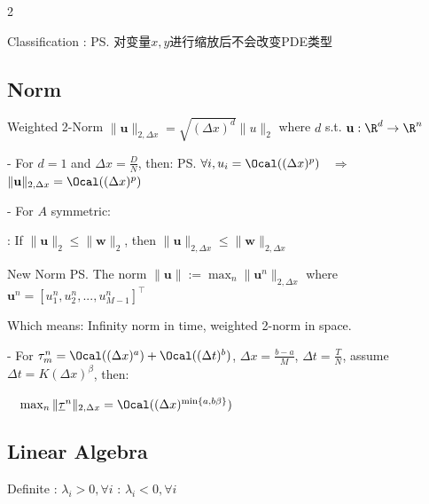 \documentclass{note}
\begin{document}
\begin{multicols}{2}
{{\begin{MyTh}{Classification}
        \quad {}: \ps{\tiny 对变量$x,y$进行缩放后不会改变PDE类型}
    \end{MyTh}

    \subsection{Norm}

    \begin{MyTh}{Weighted 2-Norm}
        $\|\mathbf{u}\|_{2,\Delta x}=\sqrt{(\Delta x)^d}\|u\|_2$ \quad where $d$ s.t. $\mathbf{u}:\R^d\to\R^n$

        \quad - For $d=1$ and $\Delta x=\frac{D}{N}$, then: \ps{$\forall i,u_i=\Ocal((\Delta x)^p)$ \ $\Rightarrow$ \ $\|\mathbf{u}\|_{2,\Delta x}=\Ocal((\Delta x)^p)$}

        \quad - For $A$ symmetric:  \quad {}

        \quad {}: \tiny If $\|\mathbf{u}\|_{2}\leq \|\mathbf{w}\|_{2}$, then $\|\mathbf{u}\|_{2,\Delta x}\leq \|\mathbf{w}\|_{2,\Delta x}$
    \end{MyTh}

    \begin{MyTh}{New Norm}\tiny 
        \ps{The norm $\|\mathbf{u}\|:=\max_{n}\|\mathbf{u}^n\|_{2,\Delta x}$ \quad where $\mathbf{u}^n=[u_1^n,u_2^n,...,u_{M-1}^n]^\top$}

        \qquad\qquad\qquad\quad Which means: Infinity norm in time, weighted 2-norm in space. \quad {}

        \quad - For $\tau^n_m=\Ocal((\Delta x)^a) + \Ocal((\Delta t)^b)$, $\Delta x=\frac{b-a}{M}$, $\Delta t=\frac{T}{N}$, assume $\Delta t=K(\Delta x)^\beta$, then:
        
        \quad \ \ $\max_{n}\|\underline{\tau}^n\|_{2,\Delta x}=\Ocal((\Delta x)^{\min\{a,b\beta\}})$
    \end{MyTh}

    \subsection{Linear Algebra}

    \begin{MyTh}{Definite}\tiny
        : $\lambda_i>0,\forall i$ \quad {}: $\lambda_i<0,\forall i$
    \end{MyTh}
    
}}
\end{multicols}
\end{document}
